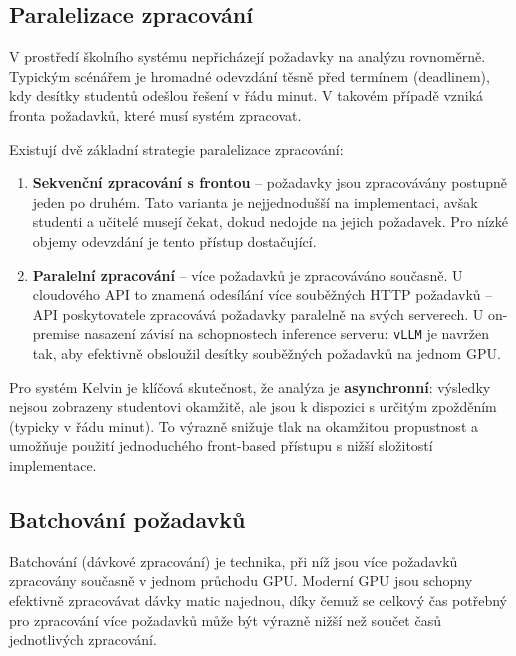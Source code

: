 \subsection{Paralelizace zpracování}
\label{subsec:technical-parallelism}

V prostředí školního systému nepřicházejí požadavky na analýzu rovnoměrně.
Typickým scénářem je hromadné odevzdání těsně před termínem (deadlinem), kdy desítky studentů odešlou řešení v řádu minut.
V takovém případě vzniká fronta požadavků, které musí systém zpracovat.

Existují dvě základní strategie paralelizace zpracování:

\begin{enumerate}
    \item \textbf{Sekvenční zpracování s frontou} -- požadavky jsou zpracovávány postupně jeden po druhém.
    Tato varianta je nejjednodušší na implementaci, avšak studenti a učitelé musejí čekat, dokud nedojde na jejich požadavek.
    Pro nízké objemy odevzdání je tento přístup dostačující.

    \item \textbf{Paralelní zpracování} -- více požadavků je zpracováváno současně.
    U cloudového API to znamená odesílání více souběžných HTTP požadavků -- API poskytovatele zpracovává požadavky paralelně na svých serverech.
    U on-premise nasazení závisí na schopnostech inference serveru: \texttt{vLLM} \cite{vllm2023} je navržen tak, aby efektivně obsloužil desítky souběžných požadavků na jednom GPU.
\end{enumerate}

Pro systém Kelvin je klíčová skutečnost, že analýza je \textbf{asynchronní}: výsledky nejsou zobrazeny studentovi okamžitě, ale jsou k dispozici s určitým zpožděním (typicky v řádu minut).
To výrazně snižuje tlak na okamžitou propustnost a umožňuje použití jednoduchého front-based přístupu s nižší složitostí implementace.

\subsection{Batchování požadavků}
\label{subsec:technical-batching}

Batchování (dávkové zpracování) je technika, při níž jsou více požadavků zpracovány současně v jednom průchodu GPU.
Moderní GPU jsou schopny efektivně zpracovávat dávky matic najednou, díky čemuž se celkový čas potřebný pro zpracování více požadavků může být výrazně nižší než součet časů jednotlivých zpracování.

